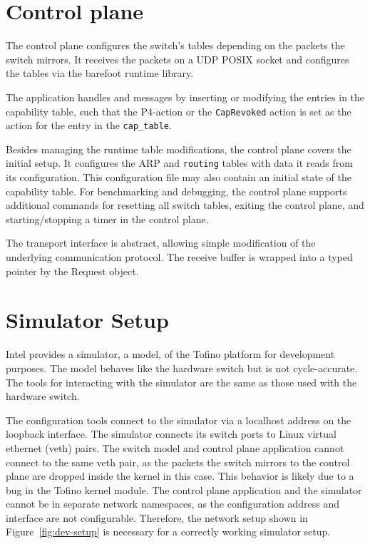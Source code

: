 \section{Control plane}

The control plane configures the switch's tables depending on the packets the switch mirrors. It receives the packets on a \ac{UDP} POSIX socket and configures the tables via the barefoot runtime library.

The application handles  and  messages by inserting or modifying the entries in the capability table, such that the  P4-action or the \texttt{CapRevoked} action is set as the action for the entry in the \texttt{cap\_table}.

Besides managing the runtime table modifications, the control plane covers the initial setup. It configures the \ac{ARP} and \texttt{routing} tables with data it reads from its configuration. This configuration file may also contain an initial state of the capability table.
For benchmarking and debugging, the control plane supports additional commands for resetting all switch tables, exiting the control plane, and starting/stopping a timer in the control plane.

The transport interface is abstract, allowing simple modification of the underlying communication protocol. The receive buffer is wrapped into a typed pointer by the Request object.
\section{Simulator Setup}
Intel provides a simulator, a model, of the Tofino platform for development purposes. The model behaves like the hardware switch but is not cycle-accurate.
The tools for interacting with the simulator are the same as those used with the hardware switch.

The configuration tools connect to the simulator via a localhost address on the loopback interface. The simulator connects its switch ports to Linux virtual ethernet (veth) pairs. The switch model and control plane application cannot connect to the same veth pair, as the packets the switch mirrors to the control plane are dropped inside the kernel in this case. This behavior is likely due to a bug in the Tofino kernel module. The control plane application and the simulator cannot be in separate network namespaces, as the configuration address and interface are not configurable. Therefore, the network setup shown in Figure~\ref{fig:dev-setup} is necessary for a correctly working simulator setup.

